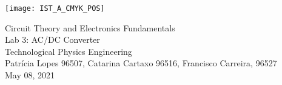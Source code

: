 
\thispagestyle {empty}


\begin{center}
    \texttt{[image: IST\_A\_CMYK\_POS]}
\end{center}


\begin{center}


    {\FontLb \Huge Circuit Theory and Electronics Fundamentals} \\ %
    \vspace{0.8cm}
    {\FontSn \LARGE Lab 3: AC/DC Converter} \\
    \vspace{0.5cm}
    {\FontSn Technological Physics Engineering} \\ %
    \vspace{0.5cm}
    {\FontSn \normalsize Patrícia Lopes 96507, Catarina Cartaxo 96516, Francisco Carreira, 96527} \\
    \vspace{0.3cm}
    {\FontSn \small May 08, 2021} \\ %
    \vspace{1cm}
\end{center}


